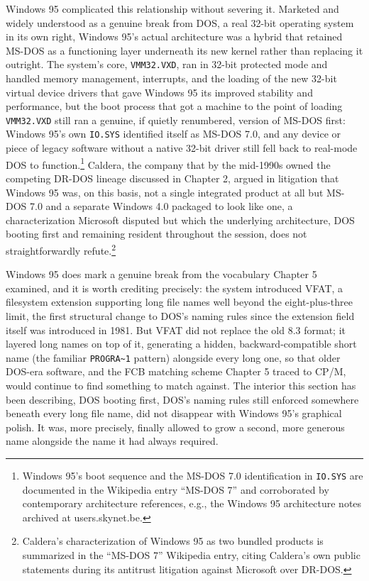 \documentclass[11pt]{book}
\begin{document}
Windows 95 complicated this relationship without severing it. Marketed and widely understood as a genuine break from DOS, a real 32-bit operating system in its own right, Windows 95's actual architecture was a hybrid that retained MS-DOS as a functioning layer underneath its new kernel rather than replacing it outright. The system's core, \texttt{VMM32.VXD}, ran in 32-bit protected mode and handled memory management, interrupts, and the loading of the new 32-bit virtual device drivers that gave Windows 95 its improved stability and performance, but the boot process that got a machine to the point of loading \texttt{VMM32.VXD} still ran a genuine, if quietly renumbered, version of MS-DOS first: Windows 95's own \texttt{IO.SYS} identified itself as MS-DOS 7.0, and any device or piece of legacy software without a native 32-bit driver still fell back to real-mode DOS to function.\footnote{Windows 95's boot sequence and the MS-DOS 7.0 identification in \texttt{IO.SYS} are documented in the Wikipedia entry \enquote{MS-DOS 7} and corroborated by contemporary architecture references, e.g., the Windows 95 architecture notes archived at users.skynet.be.} Caldera, the company that by the mid-1990s owned the competing DR-DOS lineage discussed in Chapter 2, argued in litigation that Windows 95 was, on this basis, not a single integrated product at all but MS-DOS 7.0 and a separate Windows 4.0 packaged to look like one, a characterization Microsoft disputed but which the underlying architecture, DOS booting first and remaining resident throughout the session, does not straightforwardly refute.\footnote{Caldera's characterization of Windows 95 as two bundled products is summarized in the \enquote{MS-DOS 7} Wikipedia entry, citing Caldera's own public statements during its antitrust litigation against Microsoft over DR-DOS.}

Windows 95 does mark a genuine break from the vocabulary Chapter 5 examined, and it is worth crediting precisely: the system introduced VFAT, a filesystem extension supporting long file names well beyond the eight-plus-three limit, the first structural change to DOS's naming rules since the extension field itself was introduced in 1981. But VFAT did not replace the old 8.3 format; it layered long names on top of it, generating a hidden, backward-compatible short name (the familiar \texttt{PROGRA\textasciitilde1} pattern) alongside every long one, so that older DOS-era software, and the FCB matching scheme Chapter 5 traced to CP/M, would continue to find something to match against. The interior this section has been describing, DOS booting first, DOS's naming rules still enforced somewhere beneath every long file name, did not disappear with Windows 95's graphical polish. It was, more precisely, finally allowed to grow a second, more generous name alongside the name it had always required.
\end{document}
